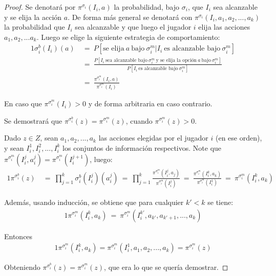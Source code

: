 \begin{proof}
Se denotará por $\pi^{\sigma_i}(I_i, a)$ la probabilidad, bajo $\sigma_i$, que $I_i$ sea alcanzable y se elija la acción $a$. De forma más general se denotará con $\pi^{\sigma_i}(I_i, a_1, a_2, ..., a_k)$ la probabilidad que $I_i$ sea alcanzable y que luego el jugador $i$ elija las acciones $a_1, a_2, ... a_k$. Luego se elige la siguiente estrategia de comportamiento:
\begin{alignat}{1}
\sigma_i^b(I_i)(a)\ &=\ P[\text{se elija}\ a\ \text{bajo}\ \sigma^m_i | I_i\ \text{es alcanzable bajo}\ \sigma^m_i] \\
&=\ \frac{P[I_i\ \text{sea alcanzable bajo}\ \sigma^m_i\ \text{y se elija la opción}\ a\ \text{bajo}\ \sigma^m_i]}{ P[I_i\ \text{es alcanzable bajo}\ \sigma^m_i] } \\
&=\ \frac{\pi^{\sigma^m_i}(I_i, a)}{\pi^{\sigma^m_i}(I_i)} \label{eq:mixta-a-comportamiento}
\end{alignat}

En caso que $\pi^{\sigma^m_i}(I_i) > 0$ y de forma arbitraria en caso contrario.

Se demostrará que $\pi^{\sigma^b_i}(z) = \pi^{\sigma^m_i}(z)$, cuando $\pi^{\sigma^m_i}(z) > 0$. 
	
Dado $z \in Z $, sean $a_1, a_2, ..., a_k$ las acciones elegidas por el jugador $i$ (en ese orden), y sean $I^1_i, I^2_i, ..., I^k_i$ los conjuntos de información respectivos. Note que $\pi^{\sigma^m_i}(I^j_i, a^j_i) = \pi^{\sigma^m_i}(I^{j+1}_i)$, luego:
\begin{alignat}{1}
\pi^{\sigma^b_i}(z)\ &=\ \prod_{j = 1}^k \sigma^b_i(I^j_i)(a^j_i)\ =\ \prod _{j = 1}^k \frac{\pi^{\sigma^m_i}(I^j_i, a_j)}{\pi^{\sigma^m_i}(I^j_i)}\ =\ \frac{\pi^{\sigma^m_i}(I^k_i, a_k)}{\pi^{\sigma^m_i}(I^1_i)}\ =\ \pi^{\sigma^m_i}(I^k_i, a_k)
\end{alignat}

Además, usando inducción, se obtiene que para cualquier $k' < k$ se tiene:
\begin{alignat}{1}
\pi^{\sigma^m_i}(I^k_i, a_k)\ =\ \pi^{\sigma^m_i} (I^{k'}_i, a_{k'}, a_{k'+1}, ..., a_{k})
\end{alignat}

Entonces
\begin{alignat}{1}
\pi^{\sigma^m_i}(I^k_i, a_k) = \pi^{\sigma^m_i}(I^1_i, a_1, a_2, ..., a_k) = \pi^{\sigma^m_i}(z)
\end{alignat}

Obteniendo $\pi^{\sigma^b_i}(z) = \pi^{\sigma^m_i}(z)$, que era lo que se quería demostrar.
\end{proof}

